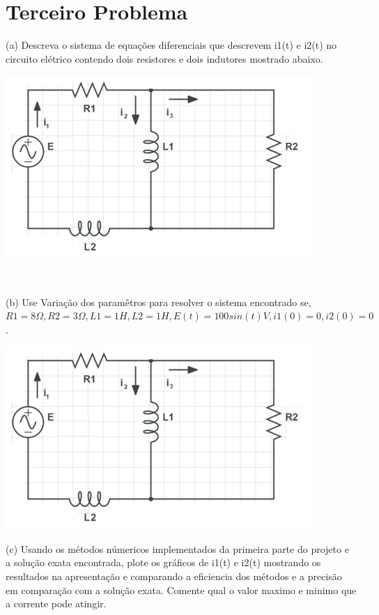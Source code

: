 \documentclass[12pt]{article}%
\begin{document}
\newpage
\section{Terceiro Problema}
    (a) Descreva o sistema de equações diferenciais que descrevem i1(t) e i2(t) no circuito elétrico contendo dois resistores e dois indutores mostrado abaixo.

    \begin{center}
        \includegraphics[scale=1.0]{problemas/p3a.png}
    \end{center}\
    
    (b) Use Variação dos paramêtros para resolver o sistema encontrado se, \(R1 = 8 \Omega, R2 = 3 \Omega, L1 = 1H, L2 = 1 H, E(t) = 100 sin(t)V, i1(0) = 0, i2(0) = 0\).

    \begin{center}
        \includegraphics[scale=1.0]{problemas/p3b.png}
    \end{center}
    
    (c) Usando os métodos númericos implementados da primeira parte do projeto e a solução exata
encontrada, plote os gráficos de i1(t) e i2(t) mostrando os resultados na apresentação e comparando a
eficiencia dos métodos e a precisão em comparação com a solução exata. Comente qual o valor maximo
e minimo que a corrente pode atingir.
\end{document}
